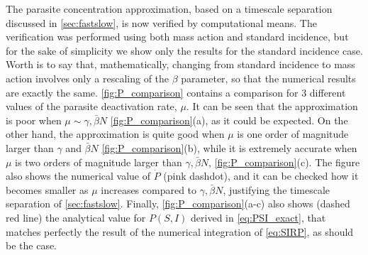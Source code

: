 The parasite concentration approximation, based on a timescale separation
discussed in \cref{sec:fastslow}, is now verified by computational means. The
verification was performed using both mass action and standard incidence, but
for the sake of simplicity we show only the results for the standard incidence
case. Worth is to say that, mathematically, changing from standard incidence to
mass action involves only a rescaling of the $\beta$ parameter, so that the
numerical results are exactly the same. \cref{fig:P_comparison} contains a
comparison for $3$ different values of the parasite deactivation rate, $\mu$.
It can be seen that the approximation is poor when $\mu\sim
    \gamma,\bar{\beta}N$ \cref{fig:P_comparison}(a), as it could be expected.
On
the other hand, the approximation is quite good when $\mu$ is one order of
magnitude larger than $\gamma$ and $\bar{\beta}N$ \cref{fig:P_comparison}(b),
while it is extremely accurate when $\mu$ is two orders of magnitude larger
than $\gamma,\bar{\beta}N$, \cref{fig:P_comparison}(c). The figure also shows
the numerical value of $\dot{P}$ (pink dashdot), and it can be checked how it
becomes smaller as $\mu$ increases compared to $\gamma,\bar{\beta}N$,
justifying the timescale separation of \cref{sec:fastslow}. Finally,
\cref{fig:P_comparison}(a-c) also shows (dashed red line) the analytical value
for $P(S,I)$ derived in \cref{eq:PSI_exact}, that matches perfectly the result
of the numerical integration of \cref{eq:SIRP}, as should be the case.

